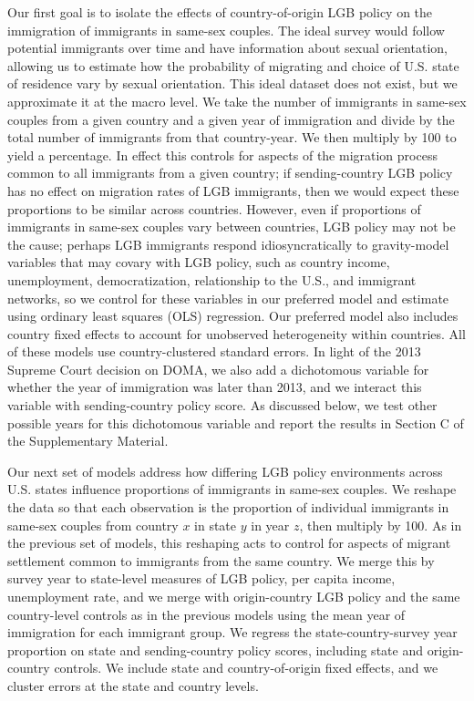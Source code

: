 \documentclass[
  11pt,
]{article}
\begin{document}
Our first goal is to isolate the effects of country-of-origin LGB policy on the immigration of immigrants in same-sex couples. The ideal survey would follow potential immigrants over time and have information about sexual orientation, allowing us to estimate how the probability of migrating and choice of U.S. state of residence vary by sexual orientation. This ideal dataset does not exist, but we approximate it at the macro level. We take the number of immigrants in same-sex couples from a given country and a given year of immigration and divide by the total number of immigrants from that country-year. We then multiply by 100 to yield a percentage. In effect this controls for aspects of the migration process common to all immigrants from a given country; if sending-country LGB policy has no effect on migration rates of LGB immigrants, then we would expect these proportions to be similar across countries. However, even if proportions of immigrants in same-sex couples vary between countries, LGB policy may not be the cause; perhaps LGB immigrants respond idiosyncratically to gravity-model variables that may covary with LGB policy, such as country income, unemployment, democratization, relationship to the U.S., and immigrant networks, so we control for these variables in our preferred model and estimate using ordinary least squares (OLS) regression. Our preferred model also includes country fixed effects to account for unobserved heterogeneity within countries. All of these models use country-clustered standard errors. In light of the 2013 Supreme Court decision on DOMA, we also add a dichotomous variable for whether the year of immigration was later than 2013, and we interact this variable with sending-country policy score. As discussed below, we test other possible years for this dichotomous variable and report the results in Section C of the Supplementary Material.

Our next set of models address how differing LGB policy environments across U.S. states influence proportions of immigrants in same-sex couples. We reshape the data so that each observation is the proportion of individual immigrants in same-sex couples from country \(x\) in state \(y\) in year \(z\), then multiply by 100. As in the previous set of models, this reshaping acts to control for aspects of migrant settlement common to immigrants from the same country. We merge this by survey year to state-level measures of LGB policy, per capita income, unemployment rate, and we merge with origin-country LGB policy and the same country-level controls as in the previous models using the mean year of immigration for each immigrant group. We regress the state-country-survey year proportion on state and sending-country policy scores, including state and origin-country controls. We include state and country-of-origin fixed effects, and we cluster errors at the state and country levels.
\end{document}
